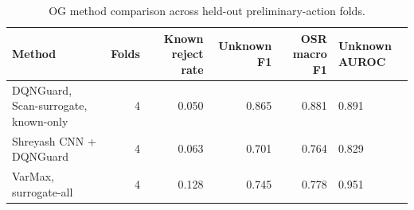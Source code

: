 \begin{table}
\caption{OG method comparison across held-out preliminary-action folds.}
\label{tab:method_comparison}
\begin{tabular}{lrrrr}
\toprule
Method & Folds & Known reject rate & Unknown F1 & OSR macro F1 & Unknown AUROC \\
\midrule
DQNGuard, Scan-surrogate, known-only & 4 & 0.050 & 0.865 & 0.881 & 0.891 \\
Shreyash CNN + DQNGuard & 4 & 0.063 & 0.701 & 0.764 & 0.829 \\
VarMax, surrogate-all & 4 & 0.128 & 0.745 & 0.778 & 0.951 \\
\bottomrule
\end{tabular}
\end{table}
